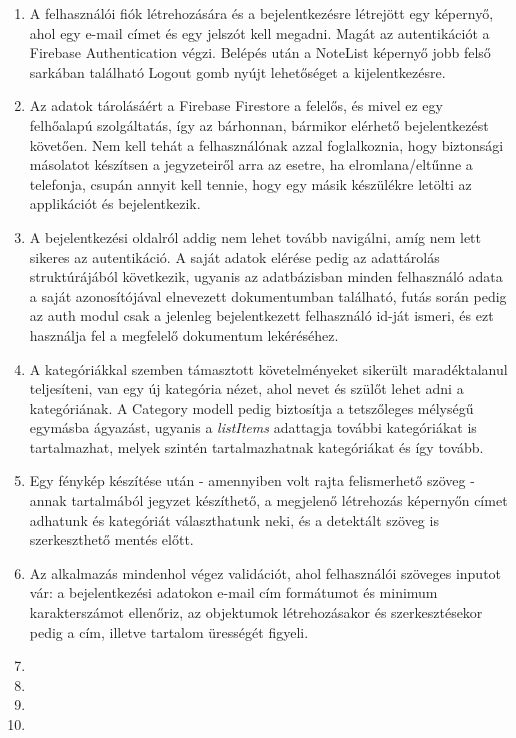 \begin{enumerate}
	\item A felhasználói fiók létrehozására és a bejelentkezésre létrejött egy képernyő, ahol egy e-mail címet és egy jelszót kell megadni. Magát az autentikációt a Firebase Authentication végzi. Belépés után a NoteList képernyő jobb felső sarkában található Logout gomb nyújt lehetőséget a kijelentkezésre.
	\item Az adatok tárolásáért a Firebase Firestore a felelős, és mivel ez egy felhőalapú szolgáltatás, így az bárhonnan, bármikor elérhető bejelentkezést követően. Nem kell tehát a felhasználónak azzal foglalkoznia, hogy biztonsági másolatot készítsen a jegyzeteiről arra az esetre, ha elromlana/eltűnne a telefonja, csupán annyit kell tennie, hogy egy másik készülékre letölti az applikációt és bejelentkezik.
	\item A bejelentkezési oldalról addig nem lehet tovább navigálni, amíg nem lett sikeres az autentikáció. A saját adatok elérése pedig az adattárolás struktúrájából következik, ugyanis az adatbázisban minden felhasználó adata a saját azonosítójával elnevezett dokumentumban található, futás során pedig az auth modul csak a jelenleg bejelentkezett felhasználó id-ját ismeri, és ezt használja fel a megfelelő dokumentum lekéréséhez. 
	\item A kategóriákkal szemben támasztott követelményeket sikerült maradéktalanul teljesíteni, van egy új kategória nézet, ahol nevet és szülőt lehet adni a kategóriának. A Category modell pedig biztosítja a tetszőleges mélységű egymásba ágyazást, ugyanis a \emph{listItems} adattagja további kategóriákat is tartalmazhat, melyek szintén tartalmazhatnak kategóriákat és így tovább. 
	\item Egy fénykép készítése után - amennyiben volt rajta felismerhető szöveg - annak tartalmából jegyzet készíthető, a megjelenő létrehozás képernyőn címet adhatunk és kategóriát választhatunk neki, és a detektált szöveg is szerkeszthető mentés előtt. 
	\item Az alkalmazás mindenhol végez validációt, ahol felhasználói szöveges inputot vár: a bejelentkezési adatokon e-mail cím formátumot és minimum karakterszámot ellenőriz, az objektumok létrehozásakor és szerkesztésekor pedig a cím, illetve tartalom ürességét figyeli. 
	\item 
	\item
	\item
	\item
\end{enumerate}

